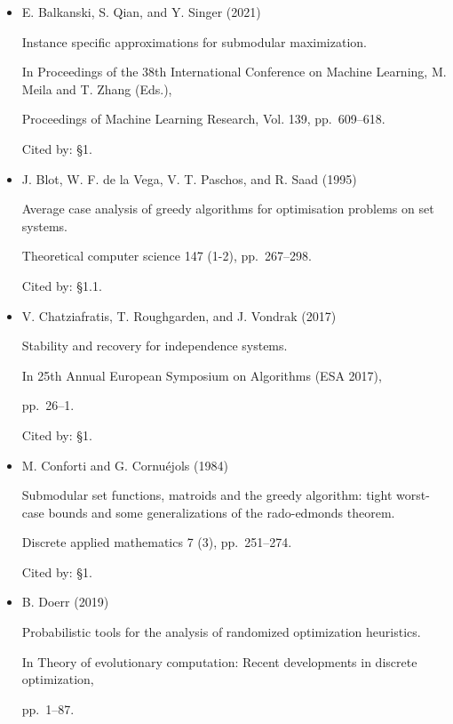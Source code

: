 \begin{itemize}
External Links: ISBN 9781450334693

Cited by: §1.1,
§1,
§1.



\item[] [5]
E. Balkanski, S. Qian, and Y. Singer (2021)

Instance specific approximations for submodular maximization.

In Proceedings of the 38th International Conference on Machine Learning,  M. Meila and T. Zhang (Eds.),

Proceedings of Machine Learning Research, Vol. 139, pp. 609–618.

Cited by: §1.



\item[] [6]
J. Blot, W. F. de la Vega, V. T. Paschos, and R. Saad (1995)

Average case analysis of greedy algorithms for optimisation problems on set systems.

Theoretical computer science 147 (1-2), pp. 267–298.

Cited by: §1.1.



\item[] [7]
V. Chatziafratis, T. Roughgarden, and J. Vondrak (2017)

Stability and recovery for independence systems.

In 25th Annual European Symposium on Algorithms (ESA 2017),

pp. 26–1.

Cited by: §1.



\item[] [8]
M. Conforti and G. Cornuéjols (1984)

Submodular set functions, matroids and the greedy algorithm: tight worst-case bounds and some generalizations of the rado-edmonds theorem.

Discrete applied mathematics 7 (3), pp. 251–274.

Cited by: §1.



\item[] [9]
B. Doerr (2019)

Probabilistic tools for the analysis of randomized optimization heuristics.

In Theory of evolutionary computation: Recent developments in discrete optimization,

pp. 1–87.


\end{itemize}
